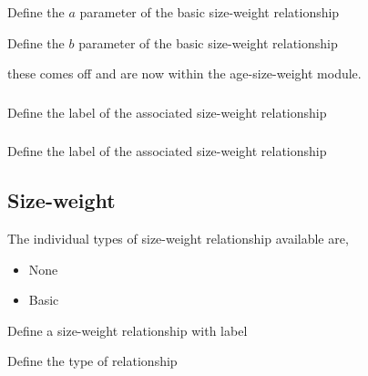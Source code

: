  {Define the $a$ parameter of the basic size-weight relationship}

 {Define the $b$ parameter of the basic size-weight relationship}

\TODOend

\TOUNDO

these comes off and are now within the age-size-weight module.

\subsubsection[von Bertalanffy]{}

 {Define the label of the associated size-weight relationship}

\subsubsection[Schnute]{}

 {Define the label of the associated size-weight relationship}

\subsection{Size-weight}

The individual types of size-weight relationship available are,

\begin{itemize}
	\item None
	\item Basic
\end{itemize}

 {Define a size-weight relationship with label}

 {Define the type of relationship}

\subsubsection[None]{}

